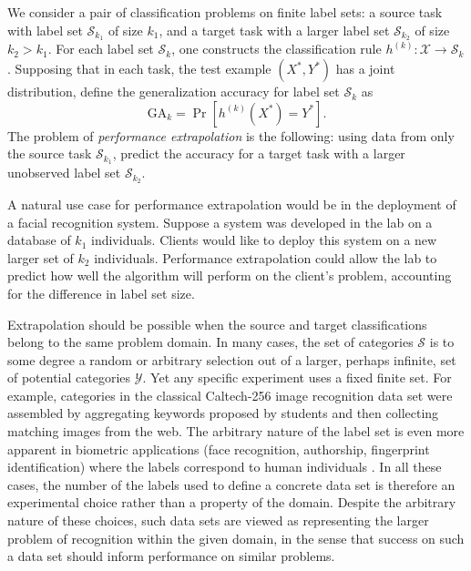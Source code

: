 \documentclass[twoside,11pt]{article}
\begin{document}
We consider a pair of classification problems on finite
label sets: a source task with label set $\mathcal{S}_{k_1}$ of size
$k_1$, and a target task with a larger label set $\mathcal{S}_{k_2}$
of size $k_2 > k_1$.  For each label set $\mathcal{S}_k$, one
constructs the classification rule $h^{(k)}:\mathcal{X} \to
\mathcal{S}_{k}$.  Supposing that in each task, the test example
$(X^*, Y^*)$ has a joint distribution, define the generalization
accuracy for label set $\mathcal{S}_k$ as
\begin{equation}\label{eq:ga_k}
\text{GA}_k = \Pr[h^{(k)}(X^*) = Y^*].
\end{equation}
The problem of \emph{performance extrapolation} is the following:
using data from only the source task $\mathcal{S}_{k_1}$, 
predict the accuracy for a target task with a larger unobserved 
label set $\mathcal{S}_{k_2}$.

A natural use case for performance extrapolation would be in the
deployment of a facial recognition system.  Suppose a system was
developed in the lab on a database of $k_1$ individuals. Clients would
like to deploy this system on a new larger set of $k_2$
individuals. Performance extrapolation could allow the lab to predict
how well the algorithm will perform on the client's problem,
accounting for the difference in label set size.

Extrapolation should be possible when the source and target
classifications belong to the same problem domain.  In
many cases, the set of categories $\mathcal{S}$ is to some degree a
random or arbitrary selection out of a larger, perhaps infinite, set
of potential categories $\mathcal{Y}$. Yet any specific experiment
uses a fixed finite set.  For example, categories in the classical
Caltech-256 image recognition data set \citep{griffin2007caltech} were
assembled by aggregating keywords proposed by students and then
collecting matching images from the web.  The arbitrary nature of the
label set is even more apparent in biometric applications (face
recognition, authorship, fingerprint identification) where the labels
correspond to human individuals \citep{togneri2011overview,
  stamatatos2014overview}.  In all these cases, the number of the
labels used to define a concrete data set is therefore an experimental
choice rather than a property of the domain.  Despite the arbitrary
nature of these choices, such data sets are viewed as representing the
larger problem of recognition within the given domain, in the sense
that success on such a data set should inform performance on similar
problems.
\end{document}
